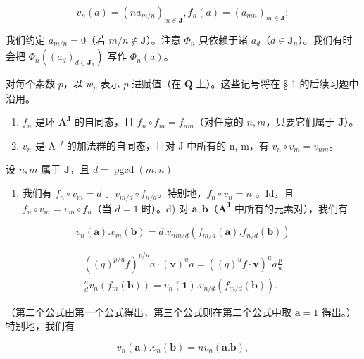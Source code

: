 \[
v _ {n} (a) = \left(n a _ {m / n}\right) _ {m \in \mathbf {J}}, f _ {n} (a) = \left(a _ {m n}\right) _ {m \in \mathbf {J}};
\]

我们约定 \(a_{m/n} = 0\)（若 \(m/n \notin \mathbf{J}\)）。注意 \(\Phi_n\) 只依赖于诸 \(a_d\)（\(d \in \mathbf{J}_n\)）。我们有时会把 \(\Phi_n((a_d)_{d \in \mathbf{J}_n})\) 写作 \(\Phi_n(a)\)。

对每个素数 \(p\)，以 \(w_{p}\) 表示 \(p\) 进赋值（在 \(\mathbf{Q}\) 上）。这些记号将在 § 1 的后续习题中沿用。

\begin{enumerate}
\def\labelenumi{\alph{enumi})}
\item
  \(f_{n}\) 是环 \(\mathbf{A}^{\mathbf{J}}\) 的自同态，且 \(f_{n} \circ f_{m} = f_{nm}\)（对任意的 \(n, m\)，只要它们属于 \(\mathbf{J}\)）。
\item
  \(v_{n}\) 是 A \(^{J}\) 的加法群的自同态，且对 J 中所有的 n, m，有 \(v_{n} \circ v_{m} = v_{nm}\)。
\end{enumerate}

设 \(n, m\) 属于 \(\mathbf{J}\)，且 \(d = \operatorname{pgcd}(m, n)\)

\begin{enumerate}
\def\labelenumi{\alph{enumi})}
\setcounter{enumi}{2}
\tightlist
\item
  我们有 \(f_{n} \circ v_{m} = d\) 。\(v_{m/d} \circ f_{n/d}\)。特别地，\(f_{n} \circ v_{n} = n\) 。Id，且 \(f_{n} \circ v_{m} = v_{m} \circ f_{n}\)（当 \(d = 1\) 时）。d) 对 \(\boldsymbol{a}, \boldsymbol{b}\)（\(\mathbf{A}^{\mathbf{J}}\) 中所有的元素对），我们有
\end{enumerate}

\[
v _ {n} (\boldsymbol {a}). v _ {m} (\boldsymbol {b}) = d. v _ {n m / d} \left(f _ {m / d} (\boldsymbol {a}). f _ {n / d} (\boldsymbol {b})\right)
\]

\[
\begin{array}{l} ((q) ^ {p / u} f) ^ {p / u} a \cdot (\boldsymbol {v}) ^ {u} a = ((q) ^ {u} f \cdot \boldsymbol {v}) ^ {u} a \frac {p}{u} \\ \frac {n}{d} v _ {n} (f _ {m} (\boldsymbol {b})) = v _ {n} (\mathbf {1}). v _ {n / d} (f _ {m / d} (\boldsymbol {b})). \end{array}
\]

（第二个公式由第一个公式得出，第三个公式则在第二个公式中取 \(\boldsymbol{a} = 1\) 得出。）特别地，我们有

\[
v _ {n} (\boldsymbol {a}). v _ {n} (\boldsymbol {b}) = n v _ {n} (\boldsymbol {a}. \boldsymbol {b}),
\]

